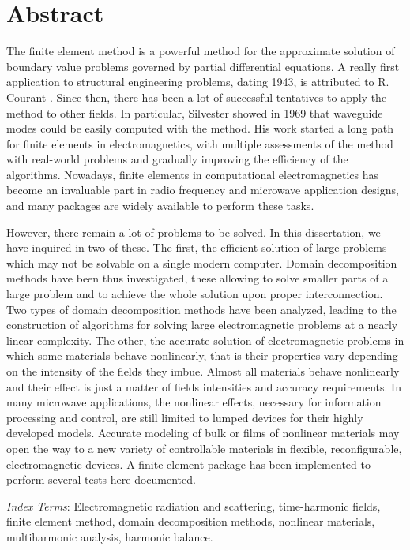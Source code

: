 \chapter*{Abstract}
The finite element method is a powerful method for the approximate solution of boundary value problems governed by partial differential equations. A really first application to structural engineering problems, dating 1943, is attributed to R. Courant \cite{courant1943variational}. Since then, there has been a lot of successful tentatives to apply the method to other fields. In particular, Silvester showed in 1969 \cite{silvester1969finite, coccioli1996finite} that waveguide modes could be easily computed with the method. His work started a long path for finite elements in electromagnetics, with multiple assessments of the method with real-world problems and gradually improving the efficiency of the algorithms. Nowadays, finite elements in computational electromagnetics has become an invaluable part in radio frequency and microwave application designs, and many packages are widely available to perform these tasks. 

However, there remain a lot of problems to be solved. In this dissertation, we have inquired in two of these. 
The first, the efficient solution of large problems which may not be solvable on a single modern computer. Domain decomposition methods have been thus investigated, these allowing to solve smaller parts of a large problem and to achieve the whole solution upon proper interconnection. Two types of domain decomposition methods have been analyzed, leading to the construction of algorithms for solving large electromagnetic problems at a nearly linear complexity. 
The other, the accurate solution of electromagnetic problems in which some materials behave nonlinearly, that is their properties vary depending on the intensity of the fields they imbue. Almost all materials behave nonlinearly and their effect is just a matter of fields intensities and accuracy requirements. In many microwave applications, the nonlinear effects, necessary for information processing and control, are still limited to lumped devices for their highly developed models. Accurate modeling of bulk or films of nonlinear materials may open the way to a new variety of controllable materials in flexible, reconfigurable, electromagnetic devices. A finite element package has been implemented to perform several tests here documented.


\vfill
\noindent \textit{Index Terms}: Electromagnetic radiation and scattering, time-harmonic fields, finite element method, domain decomposition methods, nonlinear materials, multiharmonic analysis, harmonic balance.